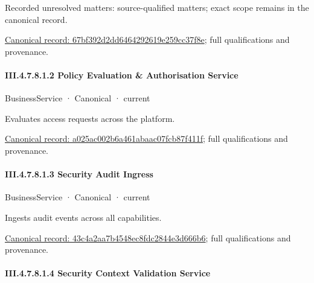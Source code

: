 {\small Recorded unresolved matters: source-qualified matters; exact scope remains in the canonical record.}\par
{\footnotesize \href{../../../../continuum/business/business-service/67bf392d2dd6464292619e259cc37f8e.md}{Canonical record: 67bf392d2dd6464292619e259cc37f8e}; full qualifications and provenance.}\par
\paragraph*{III.4.7.8.1.2 Policy Evaluation \& Authorisation Service}
\label{navigation:III.4.7.8.1.2}

\label{element:a025ac002b6a461abaac07fcb87f411f}
{\small BusinessService · Canonical · current}\par

Evaluates access requests across the platform.


{\footnotesize \href{../../../../continuum/business/business-service/a025ac002b6a461abaac07fcb87f411f.md}{Canonical record: a025ac002b6a461abaac07fcb87f411f}; full qualifications and provenance.}\par
\paragraph*{III.4.7.8.1.3 Security Audit Ingress}
\label{navigation:III.4.7.8.1.3}

\label{element:43c4a2aa7b4548ec8fdc2844e3d666b6}
{\small BusinessService · Canonical · current}\par

Ingests audit events across all capabilities.


{\footnotesize \href{../../../../continuum/business/business-service/43c4a2aa7b4548ec8fdc2844e3d666b6.md}{Canonical record: 43c4a2aa7b4548ec8fdc2844e3d666b6}; full qualifications and provenance.}\par
\paragraph*{III.4.7.8.1.4 Security Context Validation Service}
\label{navigation:III.4.7.8.1.4}

